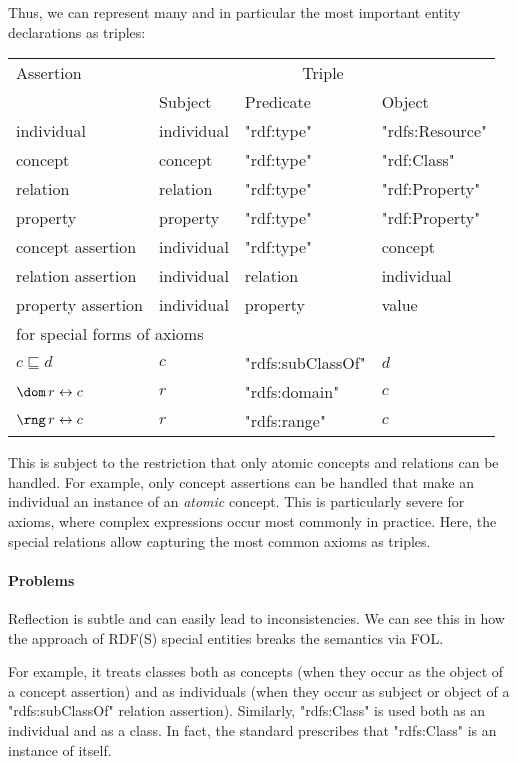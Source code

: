 Thus, we can represent many and in particular the most important entity declarations as triples:
\begin{center}
\begin{tabular}{l|lll}
Assertion & \multicolumn{3}{c}{Triple} \\
          & Subject & Predicate & Object \\
\hline
individual & individual & "rdf:type" & "rdfs:Resource" \\
concept  & concept & "rdf:type" & "rdf:Class" \\
relation & relation & "rdf:type" & "rdf:Property" \\
property & property & "rdf:type" & "rdf:Property" \\
concept assertion  & individual & "rdf:type" & concept \\
relation assertion & individual & relation & individual \\
property assertion & individual & property & value \\
\hline
\multicolumn{4}{l}{for special forms of axioms}\\
$c\sqsubseteq d$ & $c$ & "rdfs:subClassOf" & $d$ \\
$\dom\,r\Equiv c$ & $r$ & "rdfs:domain" & $c$ \\
$\rng\, r\Equiv c$ & $r$ & "rdfs:range" & $c$ \\
\end{tabular}
\end{center}

This is subject to the restriction that only atomic concepts and relations can be handled.
For example, only concept assertions can be handled that make an individual an instance of an \emph{atomic} concept.
This is particularly severe for axioms, where complex expressions occur most commonly in practice.
Here, the special relations allow capturing the most common axioms as triples.

\paragraph{Problems}
Reflection is subtle and can easily lead to inconsistencies.
We can see this in how the approach of RDF(S) special entities breaks the semantics via FOL.

For example, it treats classes both as concepts (when they occur as the object of a concept assertion) and as individuals (when they occur as subject or object of a "rdfs:subClassOf" relation assertion).
Similarly, "rdfs:Class" is used both as an individual and as a class.
In fact, the standard prescribes that "rdfs:Class" is an instance of itself.

